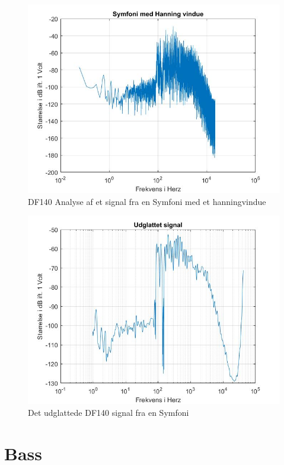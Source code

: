\begin{figure}[H]
	\centering
	\includegraphics[width=140mm]{figures/Symfoni/hanning.jpg}
	\caption{DF140 Analyse af et signal fra en Symfoni med et hanningvindue}
	\label{fig:Symfoni hanning}
\end{figure}

\begin{figure}[H]
	\centering
	\includegraphics[width=140mm]{figures/Symfoni/udglattet.jpg}
	\caption{Det udglattede DF140 signal fra en Symfoni}
	\label{fig:Symfoni udglattet}
\end{figure}

\section{Bass}

